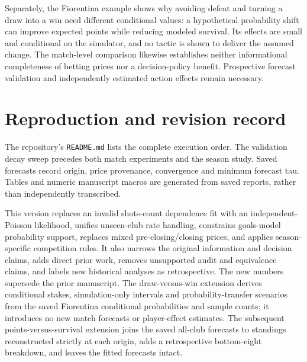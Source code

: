 \documentclass[11pt]{article}
\begin{document}
Separately, the Fiorentina example shows why avoiding defeat and turning a
draw into a win need different conditional values: a hypothetical probability
shift can improve expected points while reducing modeled survival. Its effects
are small and conditional on the simulator, and no tactic is shown to deliver
the assumed change. The match-level comparison likewise establishes neither
informational completeness of betting prices nor a decision-policy benefit.
Prospective forecast validation and independently estimated action effects
remain necessary.

\appendix
\section{Reproduction and revision record}
The repository's \texttt{README.md} lists the complete execution order.
The validation decay sweep precedes both match experiments and the season
study. Saved forecasts record origin, price provenance, convergence and
minimum forecast tau. Tables and numeric manuscript macros are generated from
saved reports, rather than independently transcribed.

This version replaces an invalid shots-count dependence fit with an
independent-Poisson likelihood, unifies unseen-club rate handling, constrains
goals-model probability support, replaces mixed pre-closing/closing prices,
and applies season-specific competition rules. It also narrows the original
information and decision claims, adds direct prior work, removes unsupported
audit and equivalence claims, and labels new historical analyses as
retrospective. The new numbers supersede the prior manuscript.
The draw-versus-win extension derives conditional stakes, simulation-only
intervals and probability-transfer scenarios from the saved Fiorentina
conditional probabilities and sample counts;
it introduces no new match forecasts or player-effect estimates.
The subsequent points-versus-survival extension joins the saved all-club
forecasts to standings reconstructed strictly at each origin, adds a
retrospective bottom-eight breakdown, and leaves the fitted forecasts intact.
\end{document}
